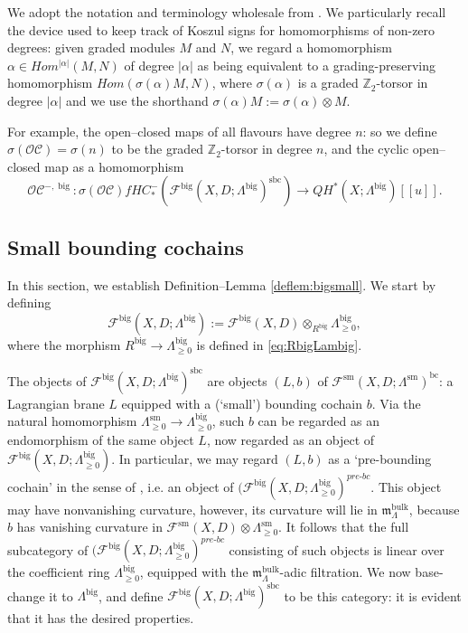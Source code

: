 \documentclass{article}
\def\fuk{\EuF}
\def\bc{\mathsf{bc}}
\newcommand{\fm}{\mathfrak{m}}
\def\cO{\mathcal{O}}
\def\cC{\mathcal{C}}
\def\Z{\mathbb{Z}}
\def\fuk{\mathcal{F}}
\def\bc{{\operatorname{bc}}}
\def\prebc{{pre\text{-}bc}}
\def\big{{\operatorname{big}}}
\def\sm{{\operatorname{sm}}}
\def\sbc{{\operatorname{sbc}}}
\def\bulk{{\operatorname{bulk}}}
\begin{document}
We adopt the notation and terminology wholesale from \cite[Section 2]{relfukii}. 
We particularly recall the device used to keep track of Koszul signs for homomorphisms of non-zero degrees: given graded modules $M$ and $N$, we regard a homomorphism $\alpha \in Hom^{|\alpha|}(M,N)$ of degree $|\alpha|$ as being equivalent to a grading-preserving homomorphism $Hom(\sigma(\alpha) M, N)$, where $\sigma(\alpha)$ is a graded $\Z_2$-torsor in degree $|\alpha|$ and we use the shorthand $\sigma(\alpha) M:= \sigma(\alpha) \otimes M$. 

For example, the open--closed maps of all flavours have degree $n$: so we define $\sigma(\cO\cC) = \sigma(n)$ to be the graded $\Z_2$-torsor in degree $n$, and the cyclic open--closed map as a homomorphism
$$\cO\cC^{-,\big}:\sigma(\cO\cC)fHC_*^-(\fuk^\big(X,D;\Lambda^\big)^\sbc) \to QH^*(X;\Lambda^\big)[[u]].$$

\subsection{Small bounding cochains}\label{sec:sbc}

In this section, we establish Definition--Lemma \ref{deflem:bigsmall}. 
We start by defining
$$\fuk^\big(X,D;\Lambda^\big) := \fuk^\big(X,D) \otimes_{R^\big} \Lambda^\big_{\ge 0},$$
where the morphism $R^\big \to \Lambda^\big_{\ge 0}$ is defined in \eqref{eq:RbigLambig}.

The objects of $\fuk^\big(X,D;\Lambda^\big)^\sbc$ are objects $(L,b)$ of $\fuk^\sm(X,D;\Lambda^\sm)^\bc$: a Lagrangian brane $L$ equipped with a (`small') bounding cochain $b$. 
Via the natural homomorphism $\Lambda^\sm_{\ge 0} \to \Lambda^\big_{\ge 0}$, such $b$ can be regarded as an endomorphism of the same object $L$, now regarded as an object of $\fuk^\big(X,D;\Lambda^\big_{\ge 0})$. 
In particular, we may regard $(L,b)$ as a `pre-bounding cochain' in the sense of \cite[Definition 2.13]{relfukii}, i.e.  an object of $(\fuk^\big(X,D; \Lambda^\big_{\ge 0})^\prebc$. 
This object may have nonvanishing curvature, however, its curvature will lie in $\fm^\bulk_\Lambda$, because $b$ has vanishing curvature in $\fuk^\sm(X,D) \otimes \Lambda^\sm_{\ge 0}$. 
It follows that the full subcategory of $(\fuk^\big(X,D; \Lambda^\big_{\ge 0})^\prebc$ consisting of such objects is linear over the coefficient ring $\Lambda^\big_{\ge 0}$, equipped with the $\fm^\bulk_\Lambda$-adic filtration. 
We now base-change it to $\Lambda^\big$, and define $\fuk^\big(X,D;\Lambda^\big)^\sbc$ to be this category: it is evident that it has the desired properties.
\end{document}
